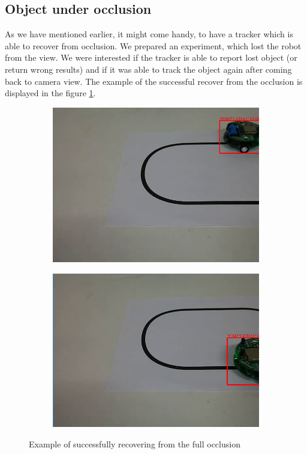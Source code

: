 
\subsection{Object under occlusion}

As we have mentioned earlier, it might come handy, to have a tracker which is
able to recover from occlusion. We prepared an experiment, which lost the robot
from the view. We were interested if the tracker is able to report lost object
(or return wrong results) and if it was able to track the object again after
coming back to camera view. The example of the successful recover from the occlusion is displayed in the figure \ref{fig:occlusion}.

\begin{figure}
\centering
\begin{subfigure}{0.48\linewidth}
\includegraphics[width=\linewidth]{img/experiments/occlusion1.png}
\end{subfigure}
\begin{subfigure}{0.48\linewidth}
\includegraphics[width=\linewidth]{img/experiments/occlusion2.png}
\end{subfigure}
\label{fig:occlusion}
\caption{Example of successfully recovering from the full occlusion}
\end{figure}


